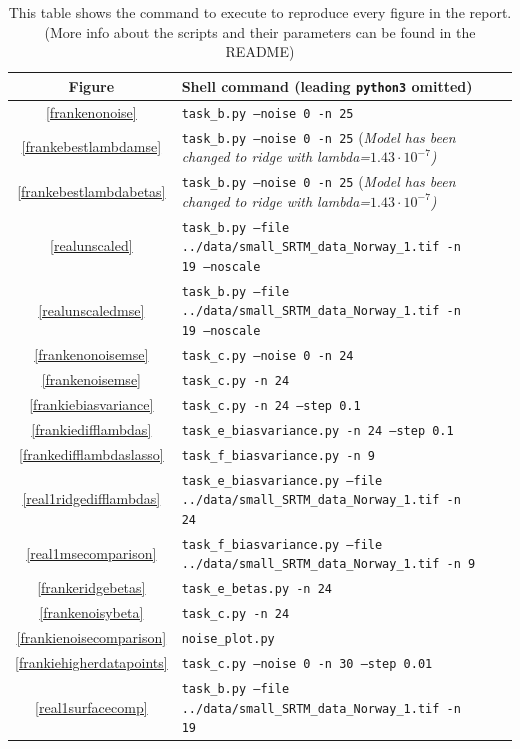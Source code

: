 \documentclass[twocolumn,10pt,cleanfoot]{asme2ej}
\begin{document}
\begin{table}
\caption{This table shows the command to execute to reproduce every figure in the report. (More info about the scripts and their parameters can be found in the README)}
\begin{center}
\label{allparamstable}
\begin{tabular}{c | l l l}
Figure & Shell command (leading \texttt{python3} omitted) \\
\hline
\ref{frankenonoise} & \texttt{task\_b.py --noise 0 -n 25}\\
\ref{frankebestlambdamse} & \texttt{task\_b.py --noise 0 -n 25} \footnotesize{(\it Model has been changed to ridge with lambda=$1.43 \cdot 10^{-7}$)}\\
\ref{frankebestlambdabetas} & \texttt{task\_b.py --noise 0 -n 25} \footnotesize{(\it Model has been changed to ridge with lambda=$1.43 \cdot 10^{-7}$)}\\
\ref{realunscaled} & \texttt{task\_b.py --file ../data/small\_SRTM\_data\_Norway\_1.tif -n 19 --noscale}\\
\ref{realunscaledmse} & \texttt{task\_b.py --file ../data/small\_SRTM\_data\_Norway\_1.tif -n 19 --noscale}\\
\ref{frankenonoisemse} & \texttt{task\_c.py --noise 0 -n 24}\\
\ref{frankenoisemse} & \texttt{task\_c.py -n 24}\\
\ref{frankiebiasvariance} & \texttt{task\_c.py -n 24 --step 0.1}\\
\ref{frankiedifflambdas} & \texttt{task\_e\_biasvariance.py -n 24 --step 0.1}\\
\ref{frankedifflambdaslasso} & \texttt{task\_f\_biasvariance.py -n 9}\\
\ref{real1ridgedifflambdas} & \texttt{task\_e\_biasvariance.py --file ../data/small\_SRTM\_data\_Norway\_1.tif -n 24}\\
\ref{real1msecomparison} & \texttt{task\_f\_biasvariance.py --file ../data/small\_SRTM\_data\_Norway\_1.tif -n 9}\\
\ref{frankeridgebetas} & \texttt{task\_e\_betas.py -n 24}\\
\ref{frankenoisybeta} & \texttt{task\_c.py -n 24}\\
\ref{frankienoisecomparison} & \texttt{noise\_plot.py}\\
\ref{frankiehigherdatapoints} & \texttt{task\_c.py --noise 0 -n 30 --step 0.01}\\
\ref{real1surfacecomp} & \texttt{task\_b.py --file ../data/small\_SRTM\_data\_Norway\_1.tif -n 19}\\

\end{tabular}
\end{center}
\end{table}
\end{document}
